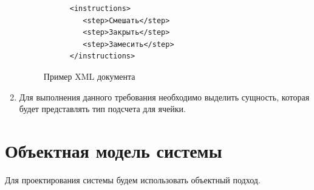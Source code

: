 \documentclass[14pt,a4paper]{reportmod}
\begin{document}
\begin{enumerate}
\begin{figure}
\begin{small}
\begin{verbatim}
      <instructions>
         <step>Смешать</step>
         <step>Закрыть</step>
         <step>Замесить</step>
      </instructions>
    \end{verbatim}
  \end{small}
  \caption{Пример XML документа}
  \label{pic:xml_sample}
\end{figure}
  \item Для выполнения данного требования необходимо выделить сущность, которая будет представлять тип подсчета для ячейки.
\end{enumerate}

\section{Объектная модель системы}
Для проектирования системы будем использовать объектный подход.
\end{document}
